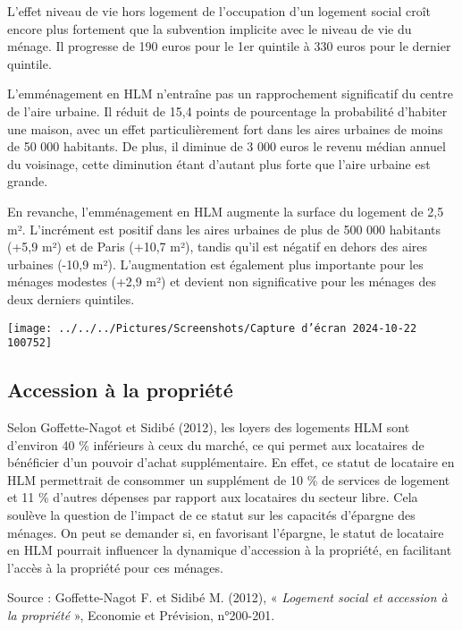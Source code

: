 \documentclass[a4paper, 12pt]{report}
\begin{document}
L’effet niveau de vie hors logement de l’occupation d’un logement social croît encore plus fortement que la subvention implicite avec le niveau de vie du ménage. Il progresse de 190 euros pour le 1er quintile à 330 euros pour le dernier quintile.

L’emménagement en HLM n’entraîne pas un rapprochement significatif du centre de l’aire urbaine. Il réduit de 15,4 points de pourcentage la probabilité d’habiter une maison, avec un effet particulièrement fort dans les aires urbaines de moins de 50 000 habitants. De plus, il diminue de 3 000 euros le revenu médian annuel du voisinage, cette diminution étant d’autant plus forte que l’aire urbaine est grande.

En revanche, l’emménagement en HLM augmente la surface du logement de 2,5 m². L’incrément est positif dans les aires urbaines de plus de 500 000 habitants (+5,9 m²) et de Paris (+10,7 m²), tandis qu’il est négatif en dehors des aires urbaines (-10,9 m²). L’augmentation est également plus importante pour les ménages modestes (+2,9 m²) et devient non significative pour les ménages des deux derniers quintiles.

\begin{center}
	\texttt{[image: ../../../Pictures/Screenshots/Capture d'écran 2024-10-22 100752]}
\end{center}

\subsection{Accession à la propriété}

Selon Goffette-Nagot et Sidibé (2012), les loyers des logements HLM sont d'environ 40 \% inférieurs à ceux du marché, ce qui permet aux locataires de bénéficier d'un pouvoir d'achat supplémentaire. En effet, ce statut de locataire en HLM permettrait de consommer un supplément de 10 \% de services de logement et 11 \% d'autres dépenses par rapport aux locataires du secteur libre. Cela soulève la question de l'impact de ce statut sur les capacités d'épargne des ménages. On peut se demander si, en favorisant l'épargne, le statut de locataire en HLM pourrait influencer la dynamique d'accession à la propriété, en facilitant l'accès à la propriété pour ces ménages.

Source : Goffette-Nagot F. et Sidibé M. (2012), « \textit{Logement social et accession à la
propriété }», Economie et Prévision, n°200-201.
\end{document}
